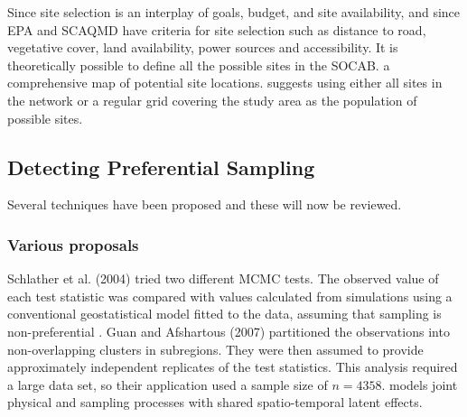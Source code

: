 Since site selection is an interplay of goals, budget, and site availability, and since \ac{EPA} and \ac{SCAQMD} have criteria for site selection such as distance to road, vegetative cover, land availability, power sources and accessibility.  It is theoretically possible to define all the possible sites in the \ac{SOCAB}.  
a comprehensive map of potential site locations.  
\citet{watson2019} suggests using either all sites in the network or a regular grid covering the study area as the population of possible sites.  


\subsection{Detecting Preferential Sampling}
\label{subsec:prefsampdetection}
Several techniques have been proposed and these will now be reviewed.

\subsubsection*{Various proposals}
\label{subsubsec:various}
Schlather et al. (2004) tried two different MCMC tests.  The observed value of each test statistic was compared with values calculated from simulations using a conventional geostatistical model fitted to the data,  assuming that sampling is non-preferential \citep{schlather2004detecting}.  Guan and Afshartous (2007) partitioned the observations into non-overlapping clusters in subregions. They were then assumed to provide approximately independent replicates of the test statistics. This analysis required a large data set, so their application used a sample size of 
$ n = 4358 $.  
\cite{diggle10} models joint physical and sampling processes with shared spatio-temporal latent effects.

